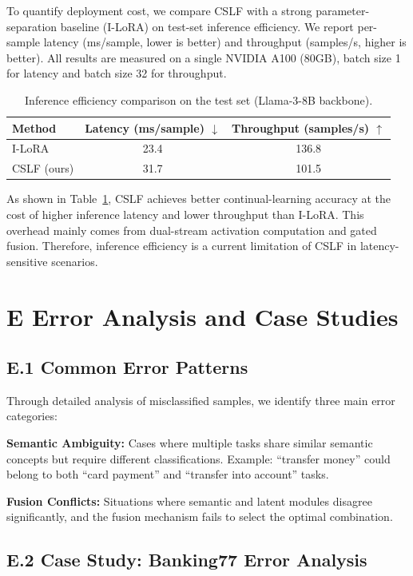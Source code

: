 \documentclass[11pt]{article}
\begin{document}
To quantify deployment cost, we compare CSLF with a strong parameter-separation baseline (I-LoRA) on test-set inference efficiency. We report per-sample latency (ms/sample, lower is better) and throughput (samples/s, higher is better). All results are measured on a single NVIDIA A100 (80GB), batch size 1 for latency and batch size 32 for throughput.

\begin{table}[t]
\centering
\begin{tabular}{lcc}
\toprule
Method & Latency (ms/sample) $\downarrow$ & Throughput (samples/s) $\uparrow$ \\
\midrule
I-LoRA & 23.4 & 136.8 \\
CSLF (ours) & 31.7 & 101.5 \\
\bottomrule
\end{tabular}
\caption{Inference efficiency comparison on the test set (Llama-3-8B backbone).}
\label{tab:inference-overhead}
\end{table}

As shown in Table~\ref{tab:inference-overhead}, CSLF achieves better continual-learning accuracy at the cost of higher inference latency and lower throughput than I-LoRA. This overhead mainly comes from dual-stream activation computation and gated fusion. Therefore, inference efficiency is a current limitation of CSLF in latency-sensitive scenarios.

\section*{E  Error Analysis and Case Studies}

\subsection*{E.1 Common Error Patterns}

Through detailed analysis of misclassified samples, we identify three main error categories:

\textbf{Semantic Ambiguity:} Cases where multiple tasks share similar semantic concepts but require different classifications. Example: ``transfer money'' could belong to both ``card payment'' and ``transfer into account'' tasks.

\textbf{Fusion Conflicts:} Situations where semantic and latent modules disagree significantly, and the fusion mechanism fails to select the optimal combination.

\subsection*{E.2 Case Study: Banking77 Error Analysis}
\end{document}

